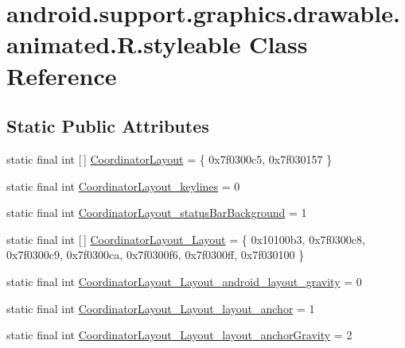 \hypertarget{classandroid_1_1support_1_1graphics_1_1drawable_1_1animated_1_1_r_1_1styleable}{}\section{android.\+support.\+graphics.\+drawable.\+animated.\+R.\+styleable Class Reference}
\label{classandroid_1_1support_1_1graphics_1_1drawable_1_1animated_1_1_r_1_1styleable}
\subsection*{Static Public Attributes}
\begin{DoxyCompactItemize}
\item 
static final int \mbox{[}$\,$\mbox{]} \mbox{\hyperlink{classandroid_1_1support_1_1graphics_1_1drawable_1_1animated_1_1_r_1_1styleable_aacddc466dac757bc49bcb277b973a6bc}{Coordinator\+Layout}} = \{ 0x7f0300c5, 0x7f030157 \}
\item 
static final int \mbox{\hyperlink{classandroid_1_1support_1_1graphics_1_1drawable_1_1animated_1_1_r_1_1styleable_a20fba048733d37132bea4661bfea189d}{Coordinator\+Layout\+\_\+keylines}} = 0
\item 
static final int \mbox{\hyperlink{classandroid_1_1support_1_1graphics_1_1drawable_1_1animated_1_1_r_1_1styleable_a5e3713c4a343739631e5d912ddbe3815}{Coordinator\+Layout\+\_\+status\+Bar\+Background}} = 1
\item 
static final int \mbox{[}$\,$\mbox{]} \mbox{\hyperlink{classandroid_1_1support_1_1graphics_1_1drawable_1_1animated_1_1_r_1_1styleable_a8c279b0269e665701c48aec7af155ef2}{Coordinator\+Layout\+\_\+\+Layout}} = \{ 0x10100b3, 0x7f0300c8, 0x7f0300c9, 0x7f0300ca, 0x7f0300f6, 0x7f0300ff, 0x7f030100 \}
\item 
static final int \mbox{\hyperlink{classandroid_1_1support_1_1graphics_1_1drawable_1_1animated_1_1_r_1_1styleable_aa39f00547d3a0e980529097498f0093b}{Coordinator\+Layout\+\_\+\+Layout\+\_\+android\+\_\+layout\+\_\+gravity}} = 0
\item 
static final int \mbox{\hyperlink{classandroid_1_1support_1_1graphics_1_1drawable_1_1animated_1_1_r_1_1styleable_a752bf674979c977c529d1d4885795116}{Coordinator\+Layout\+\_\+\+Layout\+\_\+layout\+\_\+anchor}} = 1
\item 
static final int \mbox{\hyperlink{classandroid_1_1support_1_1graphics_1_1drawable_1_1animated_1_1_r_1_1styleable_a6af233871ceca3040b088baa3da4cae4}{Coordinator\+Layout\+\_\+\+Layout\+\_\+layout\+\_\+anchor\+Gravity}} = 2

\end{DoxyCompactItemize}
